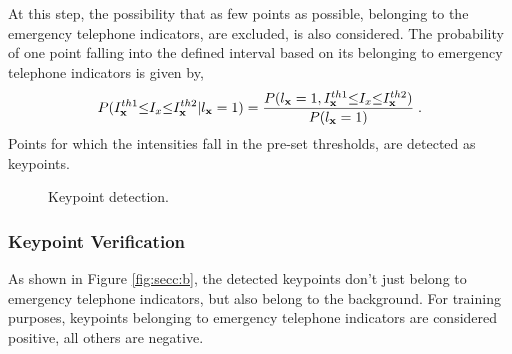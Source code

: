 At this step, the possibility that as few points as possible, belonging to the emergency telephone indicators, are excluded, is also considered. The probability of one point falling into the defined interval based on its belonging to emergency telephone indicators is given by,
\begin{equation}
P(I^{th1}_{\bf{x}}{\leq}I_x{\leq}{I^{th2}_{\bf{x}}}|l_{\bf{x}}=1)=
\frac
{P(l_{\bf{x}}=1,I^{th1}_{\bf{x}}{\leq}I_x{\leq}{I^{th2}_{\bf{x}}})} {P(l_{\bf{x}}=1)}\;.
\label{eq1.1}
\end{equation}
Points for which the intensities fall in the pre-set thresholds, are detected as keypoints.
\begin{figure}
\centering
{}
\caption[Keypoint detection]{Keypoint detection. }
\label{fig:secc}
\end{figure}


\subsubsection{Keypoint Verification}


As shown in Figure \ref{fig:secc:b}, the detected keypoints don't just belong to emergency telephone indicators, but also belong to the background. For training purposes, keypoints belonging to emergency telephone indicators are considered  positive, all others are negative.

